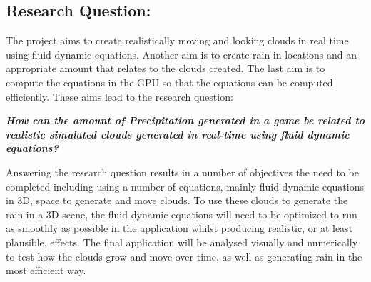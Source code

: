 \subsection{Research Question:}
\label{sec:rq}
The project aims to create realistically moving and looking clouds in real time using fluid dynamic equations.
Another aim is to create rain in locations and an appropriate amount that relates to the clouds created.
The last aim is to compute the equations in the GPU so that the equations can be computed efficiently.
These aims lead to the research question:

\textit{\textbf{How can the amount of Precipitation generated in a game be related to realistic simulated clouds generated in real-time using fluid dynamic equations?}}

Answering the research question results in a number of objectives the need to be completed including using a number of equations, mainly fluid dynamic equations in 3D, space to generate and move clouds.
To use these clouds to generate the rain in a 3D scene, the fluid dynamic equations will need to be optimized to run as smoothly as possible in the application whilst producing realistic, or at least plausible, effects.
The final application will be analysed visually and numerically to test how the clouds grow and move over time, as well as generating rain in the most efficient way.